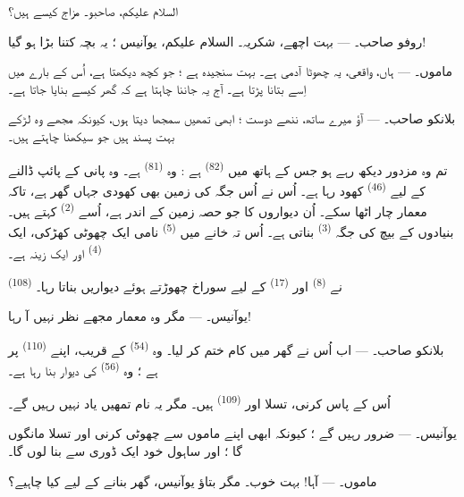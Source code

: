 السلام علیکم، صاحبو۔ مزاج کیسے ہیں؟

\textsc{روفو صاحب}۔ --- بہت اچھے، شکریہ۔ السلام علیکم، یوآنیس ؛ یہ
بچہ کتنا بڑا ہو گیا!

\textsc{ماموں}۔ --- ہاں، واقعی، یہ چھوٹا آدمی ہے۔ بہت سنجیدہ ہے ؛ جو
کچھ دیکھتا ہے، اُس کے بارے میں اِسے بتانا پڑتا ہے۔ آج یہ جاننا چاہتا
ہے کہ گھر کیسے بنایا جاتا ہے۔

\VUsaut{3.0mm}

\textsc{بلانکو صاحب}۔ --- آؤ میرے ساتھ، ننھے دوست ؛ ابھی تمھیں سمجھا
دیتا ہوں، کیونکہ مجھے وہ لڑکے بہت پسند ہیں جو سیکھنا چاہتے ہیں۔

تم وہ مزدور دیکھ رہے ہو جس کے ہاتھ میں 
\textsuperscript{(82)} ہے : وہ 
\textsuperscript{(81)} ہے۔ وہ پانی کے پائپ ڈالنے کے لیے
 \textsuperscript{(46)} کھود رہا ہے۔ اُس نے اُس جگہ کی
زمین بھی کھودی جہاں گھر ہے، تاکہ معمار چار  اٹھا
سکے۔ اُن دیواروں کا جو حصہ زمین کے اندر ہے، اُسے 
\textsuperscript{(2)} کہتے ہیں۔ بنیادوں کے بیچ کی جگہ
 \textsuperscript{(3)} بناتی ہے۔ اُس تہ خانے میں
 \textsuperscript{(5)} نامی ایک چھوٹی کھڑکی،
ایک  \textsuperscript{(4)} اور ایک زینہ ہے۔

 \textsuperscript{(108)} نے 
\textsuperscript{(8)} اور  \textsuperscript{(17)} کے
لیے سوراخ چھوڑتے ہوئے دیواریں بناتا رہا۔

\textsc{یوآنیس}۔ --- مگر وہ معمار مجھے نظر نہیں آ رہا!

\textsc{بلانکو صاحب}۔ --- اب اُس نے گھر میں کام ختم کر لیا۔ وہ
 \textsuperscript{(54)} کے قریب، اپنے 
\textsuperscript{(110)} پر ہے ؛ وہ 
\textsuperscript{(56)} کی دیوار بنا رہا ہے۔

اُس کے پاس کرنی، تسلا اور  \textsuperscript{(109)} ہیں۔
مگر یہ نام تمھیں یاد نہیں رہیں گے۔

\textsc{یوآنیس}۔ --- ضرور رہیں گے ؛ کیونکہ ابھی اپنے ماموں سے چھوٹی
کرنی اور تسلا مانگوں گا ؛ اور ساہول خود ایک ڈوری سے بنا لوں گا۔

\VUsaut{3.0mm}
\VUsaut{3.0mm}

\textsc{ماموں}۔ --- آہا! بہت خوب۔ مگر بتاؤ یوآنیس، گھر بنانے کے لیے
کیا چاہیے؟

